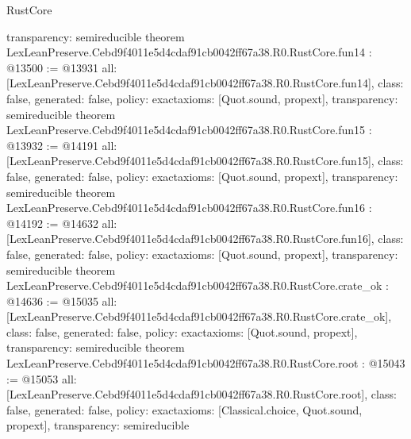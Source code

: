 \begin{lexlean}{RustCore}
\begin{coremodule}
{  transparency: semireducible
}
theorem LexLeanPreserve.Cebd9f4011e5d4cdaf91cb0042ff67a38.R0.RustCore.fun14 : @13500 := @13931 {
  all: [LexLeanPreserve.Cebd9f4011e5d4cdaf91cb0042ff67a38.R0.RustCore.fun14],
  class: false,
  generated: false,
  policy: exact{axioms: [Quot.sound, propext]},
  transparency: semireducible
}
theorem LexLeanPreserve.Cebd9f4011e5d4cdaf91cb0042ff67a38.R0.RustCore.fun15 : @13932 := @14191 {
  all: [LexLeanPreserve.Cebd9f4011e5d4cdaf91cb0042ff67a38.R0.RustCore.fun15],
  class: false,
  generated: false,
  policy: exact{axioms: [Quot.sound, propext]},
  transparency: semireducible
}
theorem LexLeanPreserve.Cebd9f4011e5d4cdaf91cb0042ff67a38.R0.RustCore.fun16 : @14192 := @14632 {
  all: [LexLeanPreserve.Cebd9f4011e5d4cdaf91cb0042ff67a38.R0.RustCore.fun16],
  class: false,
  generated: false,
  policy: exact{axioms: [Quot.sound, propext]},
  transparency: semireducible
}
theorem LexLeanPreserve.Cebd9f4011e5d4cdaf91cb0042ff67a38.R0.RustCore.crate_ok : @14636 := @15035 {
  all: [LexLeanPreserve.Cebd9f4011e5d4cdaf91cb0042ff67a38.R0.RustCore.crate_ok],
  class: false,
  generated: false,
  policy: exact{axioms: [Quot.sound, propext]},
  transparency: semireducible
}
theorem LexLeanPreserve.Cebd9f4011e5d4cdaf91cb0042ff67a38.R0.RustCore.root : @15043 := @15053 {
  all: [LexLeanPreserve.Cebd9f4011e5d4cdaf91cb0042ff67a38.R0.RustCore.root],
  class: false,
  generated: false,
  policy: exact{axioms: [Classical.choice, Quot.sound, propext]},
  transparency: semireducible
}


\end{coremodule}
\end{lexlean}
